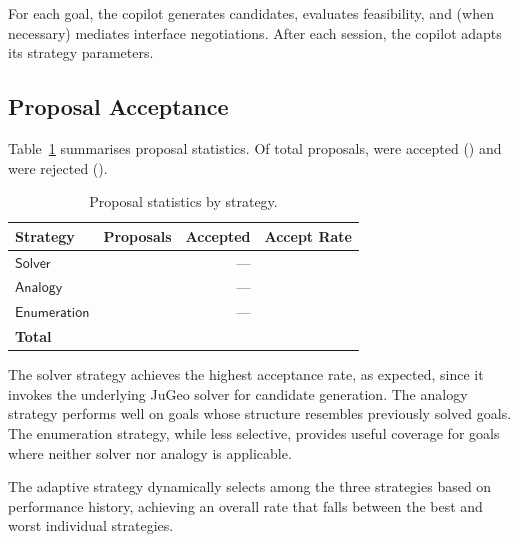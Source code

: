 \documentclass[11pt]{article}
\begin{document}
For each goal, the copilot generates candidates, evaluates
feasibility, and (when necessary) mediates interface negotiations.
After each session, the copilot adapts its strategy parameters.

\subsection{Proposal Acceptance}\label{sec:expt-accept}

Table~\ref{tab:proposals} summarises proposal statistics.  Of
\ppLXXXVInumProposals{} total proposals, \ppLXXXVInumAccepted{}
were accepted (\ppLXXXVIacceptRate{}) and \ppLXXXVInumRejected{}
were rejected (\ppLXXXVIrejectRate{}).

\begin{table}[t]
\centering
\caption{Proposal statistics by strategy.}\label{tab:proposals}
\begin{tabular}{lrrr}
\hline
\textbf{Strategy} & \textbf{Proposals} & \textbf{Accepted}
                   & \textbf{Accept Rate} \\
\hline
$\mathsf{Solver}$      & \ppLXXXVIsolverProposals{}
                        & ---
                        & \ppLXXXVIsolverAcceptRate{} \\
$\mathsf{Analogy}$     & \ppLXXXVIanalogyProposals{}
                        & ---
                        & \ppLXXXVIanalogyAcceptRate{} \\
$\mathsf{Enumeration}$ & \ppLXXXVIenumProposals{}
                        & ---
                        & \ppLXXXVIenumAcceptRate{} \\
\hline
\textbf{Total}          & \ppLXXXVInumProposals{}
                        & \ppLXXXVInumAccepted{}
                        & \ppLXXXVIacceptRate{} \\
\hline
\end{tabular}
\end{table}

The solver strategy achieves the highest acceptance rate, as
expected, since it invokes the underlying JuGeo solver for
candidate generation.  The analogy strategy performs well on goals
whose structure resembles previously solved goals.  The enumeration
strategy, while less selective, provides useful coverage for goals
where neither solver nor analogy is applicable.

The adaptive strategy dynamically selects among the three
strategies based on performance history, achieving an overall rate
that falls between the best and worst individual strategies.
\end{document}
